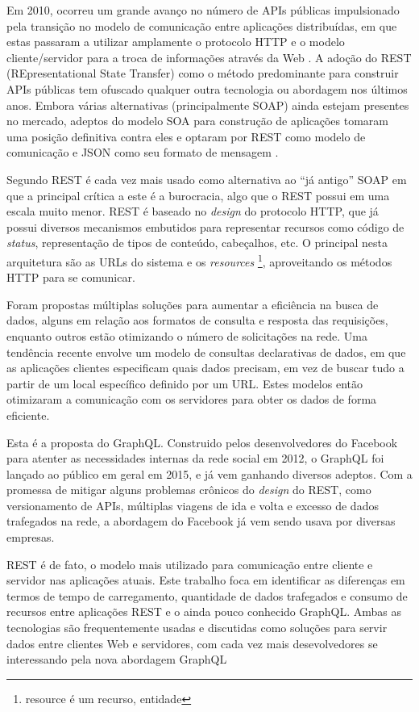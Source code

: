 Em 2010, ocorreu um grande avanço no número de APIs públicas impulsionado pela transição no modelo de comunicação entre aplicações distribuídas, em que estas passaram a utilizar amplamente o protocolo HTTP e o modelo cliente/servidor para a troca de informações através da Web \cite{tcc-ufsc}. A adoção do REST (REpresentational State Transfer) como o método predominante para construir APIs públicas tem ofuscado qualquer outra tecnologia ou abordagem nos últimos anos. Embora várias alternativas (principalmente SOAP) ainda estejam presentes no mercado, adeptos do modelo SOA para construção de aplicações tomaram uma posição definitiva contra eles e optaram por REST como modelo de comunicação e JSON como seu formato de mensagem \cite{programmableweb-rest-losing}.

Segundo  REST é cada vez mais usado como alternativa ao “já antigo” SOAP em que a principal crítica a este é a burocracia, algo que o REST possui em uma escala muito menor. REST é baseado no \textit{design} do protocolo HTTP, que já possui diversos mecanismos embutidos para representar recursos como código de \textit{status}, representação de tipos de conteúdo, cabeçalhos, etc. O principal nesta arquitetura são as URLs do sistema e os \textit{resources} \footnote{resource é um recurso, entidade}, aproveitando os métodos HTTP para se comunicar.

Foram propostas múltiplas soluções para aumentar a eficiência na busca de dados, alguns em relação aos formatos de consulta e resposta das requisições, enquanto outros estão otimizando o número de solicitações na rede. Uma tendência recente envolve um modelo de consultas declarativas de dados, em que as aplicações clientes especificam quais dados precisam, em vez de buscar tudo a partir de um local específico definido por um URL. Estes modelos então otimizaram a comunicação com os servidores para obter os dados de forma eficiente.

Esta é a proposta do GraphQL. Construido pelos desenvolvedores do Facebook para atenter as necessidades internas da rede social em 2012, o GraphQL foi lançado ao público em geral em 2015, e já vem ganhando diversos adeptos. Com a promessa de mitigar alguns problemas crônicos do \textit{design} do REST, como versionamento de APIs, múltiplas viagens de ida e volta e excesso de dados trafegados na rede, a abordagem do Facebook já vem sendo usava por diversas empresas.

REST é de fato, o modelo mais utilizado para comunicação entre cliente e servidor nas aplicações atuais. Este trabalho foca em identificar as diferenças em termos de tempo de carregamento, quantidade de dados trafegados e consumo de recursos entre aplicações REST e o ainda pouco conhecido GraphQL. Ambas as tecnologias são frequentemente usadas e discutidas como soluções para servir dados entre clientes Web e servidores, com cada vez mais desevolvedores se interessando pela nova abordagem GraphQL

